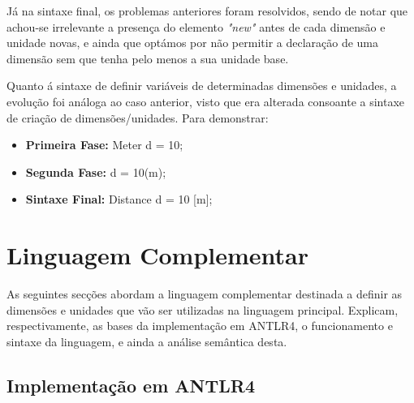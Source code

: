 \documentclass[10pt,portuguese]{article}
\begin{document}
\par Já na sintaxe final, os problemas anteriores foram resolvidos, sendo de notar que achou-se irrelevante a presença do elemento \emph{"new"} antes de cada dimensão e unidade novas, e ainda que optámos por não permitir a declaração de uma dimensão sem que tenha pelo menos a sua unidade base.
\newline
\newline
\par Quanto á sintaxe de definir variáveis de determinadas dimensões e unidades, a evolução foi análoga ao caso anterior, visto que era alterada consoante a sintaxe de criação de dimensões/unidades. Para demonstrar:
\begin{itemize}
    \item \textbf{Primeira Fase:} Meter d = 10;
    \item \textbf{Segunda Fase:} d = 10(m);
    \item \textbf{Sintaxe Final:} Distance d = 10 [m];
\end{itemize}

\newpage
\section{Linguagem Complementar}

\par As seguintes secções abordam a linguagem complementar destinada a definir as dimensões e unidades que vão ser utilizadas na linguagem principal. Explicam, respectivamente, as bases da implementação em ANTLR4, o funcionamento e sintaxe da linguagem, e ainda a análise semântica desta.

\subsection{Implementação em ANTLR4}
\end{document}
